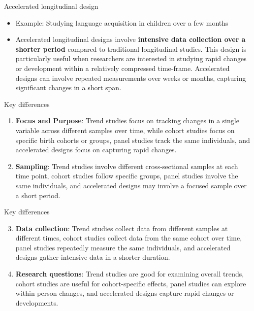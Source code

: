 \documentclass[
  ignorenonframetext,
  aspectratio=169,
]{beamer}
\providecommand{\tightlist}{%
  \setlength{\itemsep}{0pt}\setlength{\parskip}{0pt}}\usepackage{longtable,booktabs,array}
\begin{document}
\begin{frame}{Accelerated longitudinal design}
\label{accelerated-longitudinal-design}
\begin{itemize}[<+->]
\tightlist
\item
  Example: Studying language acquisition in children over a few months
\item
  Accelerated longitudinal designs involve \textbf{intensive data
  collection over a shorter period} compared to traditional longitudinal
  studies. This design is particularly useful when researchers are
  interested in studying rapid changes or development within a
  relatively compressed time-frame. Accelerated designs can involve
  repeated measurements over weeks or months, capturing significant
  changes in a short span.
\end{itemize}
\end{frame}

\begin{frame}{Key differences}
\label{key-differences}
\begin{enumerate}[<+->]
\item
  \textbf{Focus and Purpose}: Trend studies focus on tracking changes in
  a single variable across different samples over time, while cohort
  studies focus on specific birth cohorts or groups, panel studies track
  the same individuals, and accelerated designs focus on capturing rapid
  changes.
\item
  \textbf{Sampling}: Trend studies involve different cross-sectional
  samples at each time point, cohort studies follow specific groups,
  panel studies involve the same individuals, and accelerated designs
  may involve a focused sample over a short period.
\end{enumerate}
\end{frame}

\begin{frame}{Key differences}
\label{key-differences-1}
\begin{enumerate}[<+->]
\setcounter{enumi}{2}
\item
  \textbf{Data collection}: Trend studies collect data from different
  samples at different times, cohort studies collect data from the same
  cohort over time, panel studies repeatedly measure the same
  individuals, and accelerated designs gather intensive data in a
  shorter duration.
\item
  \textbf{Research questions}: Trend studies are good for examining
  overall trends, cohort studies are useful for cohort-specific effects,
  panel studies can explore within-person changes, and accelerated
  designs capture rapid changes or developments.
\end{enumerate}
\end{frame}
\end{document}
